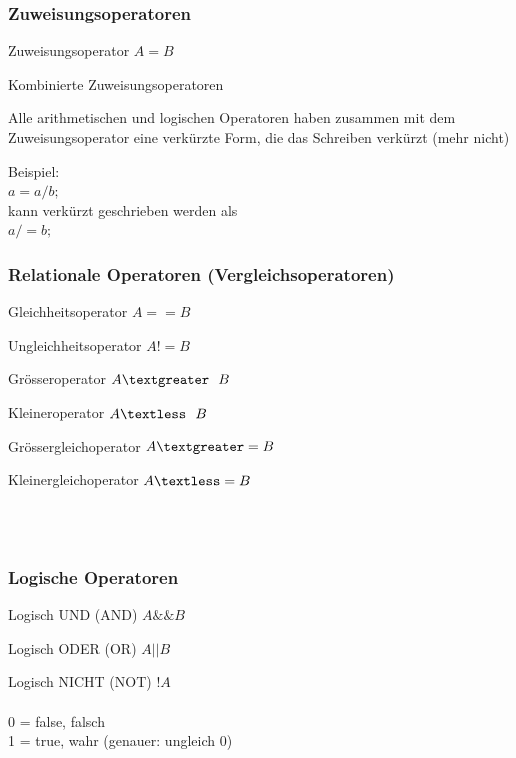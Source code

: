 				\begin{minipage}[t]{9 cm}
					\subsubsection{Zuweisungsoperatoren}
						\begin{compactitem}
							\item Zuweisungsoperator $A = B$
							\item Kombinierte Zuweisungsoperatoren
							\begin{compactitem}
								\item Alle arithmetischen und logischen Operatoren haben zusammen mit dem
								Zuweisungsoperator eine verkürzte Form, die das Schreiben verkürzt (mehr
								nicht)
								\item Beispiel:\\
								$a = a / b;$\\
								kann verkürzt geschrieben werden als\\
								$a /= b;$
							\end{compactitem}
						\end{compactitem}
				\end{minipage}
				\hspace*{0.5cm}
				\begin{minipage}[t]{6 cm}
					\subsubsection{Relationale Operatoren  (Vergleichsoperatoren)}
						\begin{compactitem}
							\item Gleichheitsoperator $A == B$
							\item Ungleichheitsoperator $A != B$
							\item Grösseroperator $A \textgreater \ \ B$
							\item Kleineroperator $A \textless \ \ B$
							\item Grössergleichoperator $A \textgreater= B$
							\item Kleinergleichoperator $A \textless= B$ 
						\end{compactitem}	
				\end{minipage}\\\\
				\begin{minipage}[t]{9 cm}
					\subsubsection{Logische Operatoren}
						\begin{compactitem}
							\item Logisch UND (AND) $A \&\& B$
							\item Logisch ODER (OR) $A || B$
							\item Logisch NICHT (NOT) $!A$\\\\
							0 = false, falsch\\
							1 = true, wahr (genauer: ungleich 0)
						\end{compactitem}
				\end{minipage}
